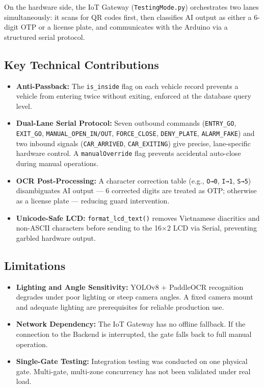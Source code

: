 \documentclass[a4paper]{article}
\begin{document}
On the hardware side, the IoT Gateway (\texttt{TestingMode.py}) orchestrates two lanes simultaneously: it scans for QR codes first, then classifies AI output as either a 6-digit OTP or a license plate, and communicates with the Arduino via a structured serial protocol.

\subsection*{Key Technical Contributions}

\begin{itemize}
    \item \textbf{Anti-Passback:} The \texttt{is\_inside} flag on each vehicle record prevents a vehicle from entering twice without exiting, enforced at the database query level.
    \item \textbf{Dual-Lane Serial Protocol:} Seven outbound commands (\texttt{ENTRY\_GO}, \texttt{EXIT\_GO}, \texttt{MANUAL\_OPEN\_IN/OUT}, \texttt{FORCE\_CLOSE}, \texttt{DENY\_PLATE}, \texttt{ALARM\_FAKE}) and two inbound signals (\texttt{CAR\_ARRIVED}, \texttt{CAR\_EXITING}) give precise, lane-specific hardware control. A \texttt{manualOverride} flag prevents accidental auto-close during manual operations.
    \item \textbf{OCR Post-Processing:} A character correction table (e.g., \texttt{O→0}, \texttt{I→1}, \texttt{S→5}) disambiguates AI output — 6 corrected digits are treated as OTP; otherwise as a license plate — reducing guard intervention.
    \item \textbf{Unicode-Safe LCD:} \texttt{format\_lcd\_text()} removes Vietnamese diacritics and non-ASCII characters before sending to the 16×2 LCD via Serial, preventing garbled hardware output.
\end{itemize}

\subsection*{Limitations}

\begin{itemize}
    \item \textbf{Lighting and Angle Sensitivity:} YOLOv8 + PaddleOCR recognition degrades under poor lighting or steep camera angles. A fixed camera mount and adequate lighting are prerequisites for reliable production use.
    \item \textbf{Network Dependency:} The IoT Gateway has no offline fallback. If the connection to the Backend is interrupted, the gate falls back to full manual operation.
    \item \textbf{Single-Gate Testing:} Integration testing was conducted on one physical gate. Multi-gate, multi-zone concurrency has not been validated under real load.
\end{itemize}
\end{document}
